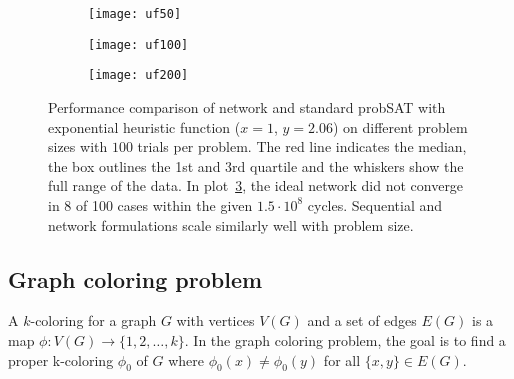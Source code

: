 \documentclass[10pt]{article}
\begin{document}
\begin{figure}
 \centering
     \begin{subfigure}[h]{0.3\textwidth}
     \texttt{[image: uf50]} 
     \label{fig:scale_50}
   \end{subfigure}
   \quad
   \begin{subfigure}[h]{0.3\textwidth}
     \texttt{[image: uf100]} 
     \label{fig:scale_100}
   \end{subfigure}
   \quad
    \begin{subfigure}[h]{0.3\textwidth}
     \texttt{[image: uf200]} 
     \label{fig:scale_200}
   \end{subfigure}
   \caption{Performance comparison of network and standard probSAT with exponential heuristic function ($x=1$, $y=2.06$) on different problem sizes with $100$ trials per problem.  The red line indicates the median, the box outlines the 1st and 3rd quartile and the whiskers show the full range of the data. In plot~\ref{fig:scale_200}, the ideal network did not converge in 8 of 100 cases within the given $1.5\cdot 10^8$ cycles. Sequential and network formulations scale similarly well with problem size.}
\label{fig:scale}
\end{figure}	




\subsection*{Graph coloring problem}
\label{sec:colour}
A $k$-coloring for a graph $G$ with vertices $V(G)$ and a set of edges $E(G)$ is a map $\phi: V(G) \rightarrow \{1,2,\ldots,k\}$. In the graph coloring problem, the goal is to find a proper k-coloring $\phi_0$ of $G$ where $\phi_0(x) \neq \phi_0(y)$ for all $\lbrace x,y \rbrace \in E(G)$.
\end{document}
